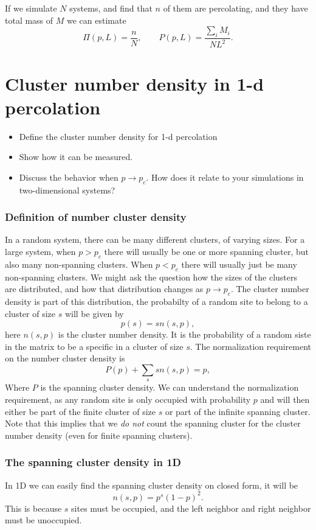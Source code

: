 \documentclass[a4paper, 11pt, notitlepage, english]{article}
\begin{document}
If we simulate $N$ systems, and find that $n$ of them are percolating, and they have total mass of $M$ we can estimate 
$$\Pi(p,L) = \frac{n}{N}, \qquad P(p,L) = \frac{\sum_i M_i}{NL^2}.$$

\clearpage


\section{ Cluster number density in 1-d percolation}
\begin{itemize}
	\item Define the cluster number density for 1-d percolation
	\item Show how it can be measured.
	\item Discuss the behavior when $p \to p_c$. How does it relate to your simulations in two-dimensional systems?
\end{itemize}

\subsubsection*{Definition of number cluster density}

In a random system, there can be many different clusters, of varying sizes. For a large system, when $p > p_c$ there will usually be one or more spanning cluster, but also many non-spanning clusters. When $p < p_c$ there will usually just be many non-spanning clusters. We might ask the question how the sizes of the clusters are distributed, and how that distribution changes as $p \to p_c$. The cluster number density is part of this distribution, the probabilty of a random site to belong to a cluster of size $s$ will be given by
$$p(s) = sn(s,p),$$
here $n(s,p)$ is the cluster number density. It is the probability of a random siste in the matrix to be a specific in a cluster of size $s$. The normalization requirement on the number cluster density is
$$P(p) + \sum_s s n(s,p) = p,$$
Where $P$ is the spanning cluster density. We can understand the normalization requirement, as any random site is only occupied with probability $p$ and will then either be part 
of the finite cluster of size $s$ or part of the infinite spanning cluster. Note that this implies that we \emph{do not} count the spanning cluster for the cluster number density (even for finite spanning clusters).

\subsubsection*{The spanning cluster density in 1D}
In 1D we can easily find the spanning cluster density on closed form, it will be
$$n(s,p) = p^s (1-p)^2.$$
This is because $s$ sites must be occupied, and the left neighbor and right neighbor must be unoccupied.
\end{document}
